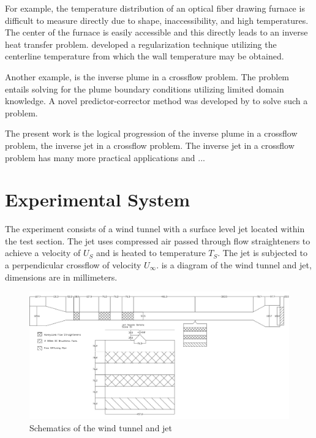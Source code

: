 \documentclass[preprint,12pt]{elsarticle}
\begin{document}
For example, the temperature distribution of an optical fiber drawing furnace is difficult to measure directly due to shape, inaccessibility, and high temperatures.  The center of the furnace is easily accessible and this directly leads to an inverse heat transfer problem.   \cite{issa} developed a regularization technique utilizing the centerline temperature from which the wall temperature may be obtained.

Another example, is the inverse plume in a crossflow problem.  The problem entails solving for the plume boundary conditions utilizing limited domain knowledge.  A novel predictor-corrector method was developed by \citet{ijhmt1} \cite{ijhmt1} to solve such a problem.  


The present work is the logical progression of the inverse plume in a crossflow problem, the inverse jet in a crossflow problem.  The inverse jet in a crossflow problem has many more practical applications and ...





\section{Experimental System}
The experiment consists of a wind tunnel with a surface level jet located within the test section.  The jet uses compressed air passed through flow straighteners to achieve a velocity of $U_S$ and is heated to temperature $T_S$.  The jet is subjected to a perpendicular crossflow of velocity $U_{\infty}$.   is a diagram of the wind tunnel and jet, dimensions are in millimeters.

\begin{figure}[!tbp]
\begin{center}
\includegraphics[scale=.30]{windtunneljet.jpg}
\caption{Schematics of the wind tunnel and jet}
\label{fig:diagramjet}
\end{center}
\end{figure}
\end{document}
